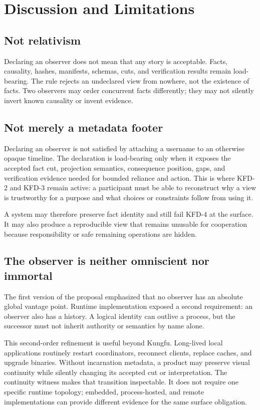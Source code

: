 \section{Discussion and Limitations}
\label{sec:discussion}

\subsection{Not relativism}

Declaring an observer does not mean that any story is acceptable. Facts,
causality, hashes, manifests, schemas, cuts, and verification results remain
load-bearing. The rule rejects an undeclared view from nowhere, not the
existence of facts. Two observers may order concurrent facts differently; they
may not silently invert known causality or invent evidence.

\subsection{Not merely a metadata footer}

Declaring an observer is not satisfied by attaching a username to an otherwise
opaque timeline. The declaration is load-bearing only when it exposes the
accepted fact cut, projection semantics, consequence position, gaps, and
verification evidence needed for bounded reliance and action. This is where
KFD-2 and KFD-3 remain active: a participant must be able to reconstruct why a
view is trustworthy for a purpose and what choices or constraints follow from
using it.

A system may therefore preserve fact identity and still fail KFD-4 at the
surface. It may also produce a reproducible view that remains unusable for
cooperation because responsibility or safe remaining operations are hidden.

\subsection{The observer is neither omniscient nor immortal}

The first version of the proposal emphasized that no observer has an absolute
global vantage point. Runtime implementation exposed a second requirement: an
observer also has a history. A logical identity can outlive a process, but the
successor must not inherit authority or semantics by name alone.

This second-order refinement is useful beyond Kungfu. Long-lived local
applications routinely restart coordinators, reconnect clients, replace caches,
and upgrade binaries.
Without incarnation metadata, a product may preserve visual continuity while
silently changing its accepted cut or interpretation. The continuity witness
makes that transition inspectable. It does not require one specific runtime
topology; embedded, process-hosted, and remote implementations can provide
different evidence for the same surface obligation.

